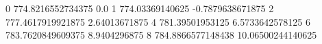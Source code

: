 0 774.8216552734375 0.0
1 774.03369140625 -0.7879638671875
2 777.4617919921875 2.64013671875
4 781.39501953125 6.5733642578125
6 783.7620849609375 8.9404296875
8 784.8866577148438 10.06500244140625

